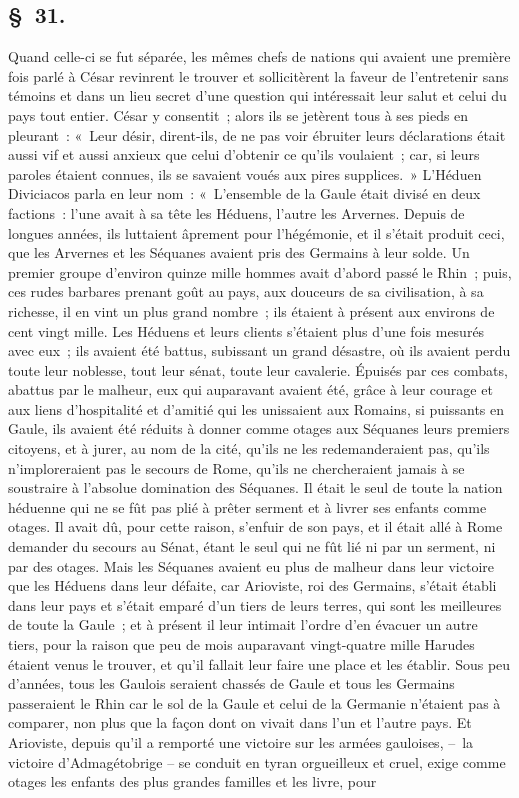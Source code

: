 \documentclass[french,twoside]{book} %
\begin{document}
\subsection[{§ 31.}]{ \textsc{§ 31.} }
\noindent Quand celle-ci se fut séparée, les mêmes chefs de nations qui avaient une première fois parlé à César revinrent le trouver et sollicitèrent la faveur de l’entretenir sans témoins et dans un lieu secret d’une question qui intéressait leur salut et celui du pays tout entier. César y consentit ; alors ils se jetèrent tous à ses pieds en pleurant : « Leur désir, dirent-ils, de ne pas voir ébruiter leurs déclarations était aussi vif et aussi anxieux que celui d’obtenir ce qu’ils voulaient ; car, si leurs paroles étaient connues, ils se savaient voués aux pires supplices. » L'Héduen Diviciacos parla en leur nom : « L'ensemble de la Gaule était divisé en deux factions : l’une avait à sa tête les Héduens, l’autre les Arvernes. Depuis de longues années, ils luttaient âprement pour l’hégémonie, et il s’était produit ceci, que les Arvernes et les Séquanes avaient pris des Germains à leur solde. Un premier groupe d’environ quinze mille hommes avait d’abord passé le Rhin ; puis, ces rudes barbares prenant goût au pays, aux douceurs de sa civilisation, à sa richesse, il en vint un plus grand nombre ; ils étaient à présent aux environs de cent vingt mille. Les Héduens et leurs clients s’étaient plus d’une fois mesurés avec eux ; ils avaient été battus, subissant un grand désastre, où ils avaient perdu toute leur noblesse, tout leur sénat, toute leur cavalerie. Épuisés par ces combats, abattus par le malheur, eux qui auparavant avaient été, grâce à leur courage et aux liens d’hospitalité et d’amitié qui les unissaient aux Romains, si puissants en Gaule, ils avaient été réduits à donner comme otages aux Séquanes leurs premiers citoyens, et à jurer, au nom de la cité, qu’ils ne les redemanderaient pas, qu’ils n’imploreraient pas le secours de Rome, qu’ils ne chercheraient jamais à se soustraire à l’absolue domination des Séquanes. Il était le seul de toute la nation héduenne qui ne se fût pas plié à prêter serment et à livrer ses enfants comme otages. Il avait dû, pour cette raison, s’enfuir de son pays, et il était allé à Rome demander du secours au Sénat, étant le seul qui ne fût lié ni par un serment, ni par des otages. Mais les Séquanes avaient eu plus de malheur dans leur victoire que les Héduens dans leur défaite, car Arioviste, roi des Germains, s’était établi dans leur pays et s’était emparé d’un tiers de leurs terres, qui sont les meilleures de toute la Gaule ; et à présent il leur intimait l’ordre d’en évacuer un autre tiers, pour la raison que peu de mois auparavant vingt-quatre mille Harudes étaient venus le trouver, et qu’il fallait leur faire une place et les établir. Sous peu d’années, tous les Gaulois seraient chassés de Gaule et tous les Germains passeraient le Rhin car le sol de la Gaule et celui de la Germanie n’étaient pas à comparer, non plus que la façon dont on vivait dans l’un et l’autre pays. Et Arioviste, depuis qu’il a remporté une victoire sur les armées gauloises, – la victoire d’Admagétobrige – se conduit en tyran orgueilleux et cruel, exige comme otages les enfants des plus grandes familles et les livre, pour 
\end{document}
